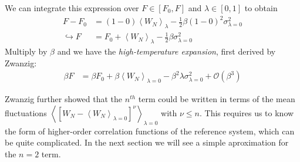 \documentclass[letterpaper,twocolumn,amsmath,amssymb,prb]{revtex4-1}
\newcommand{\1}{\ensuremath{\textbf{r}_1}}
\newcommand{\2}{\ensuremath{\textbf{r}_2}}
\newcommand{\3}{\ensuremath{\textbf{r}_3}}
\newcommand{\4}{\ensuremath{\textbf{r}_4}}
\begin{document}
We can integrate this expression over $F\in[F_0,F]$ and $\lambda\in[0,1]$ to obtain
\begin{align}
  F - F_0 &= (1-0)\left\langle W_N \right\rangle_\lambda - \frac{1}{2}\beta(1 - 0)^2\sigma_{\lambda=0}^2 \nonumber \\
  \hookrightarrow F &= F_0 + \left\langle W_N \right\rangle_\lambda - \frac{1}{2}\beta\sigma_{\lambda=0}^2 \label{eqn:F-inTermsW}
\end{align}
Multiply by $\beta$ and we have the \emph{high-temperature expansion}, first derived by
Zwanzig:\cite{Zwanzig54}
\begin{align}
  \beta F &= \beta F_0 + \beta \left\langle W_N \right\rangle_{\lambda=0} - \beta^2\lambda\sigma_{\lambda=0}^2 + \mathcal{O}(\beta^3)
\end{align}

Zwanzig further showed that the $n^{th}$ term could be written in terms of the mean fluctuations $\left\langle \left[ W_N - \left\langle W_N\right\rangle_{\lambda=0} \right]^\nu \right\rangle_{\lambda=0}$ with $\nu \leq n$. This requires us to know the form of higher-order correlation functions of the reference system, which can be quite complicated. In the next section we will see a simple aproximation for the $n=2$ term.
\end{document}
